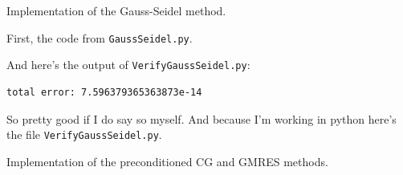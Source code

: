 \documentclass[boxes,pages]{homework}
\begin{document}
\begin{problem}
Implementation of the Gauss-Seidel method.
\end{problem}

\begin{solution}
	First, the code from \verb|GaussSeidel.py|.
	
	And here's the output of \verb|VerifyGaussSeidel.py|:
	\begin{verbatim}
total error: 7.596379365363873e-14
\end{verbatim}
	So pretty good if I do say so myself.
	And because I'm working in python here's the file \verb|VerifyGaussSeidel.py|.
	
\end{solution}


\begin{problem}
Implementation of the preconditioned CG and GMRES methods.
\end{problem}
\end{document}
